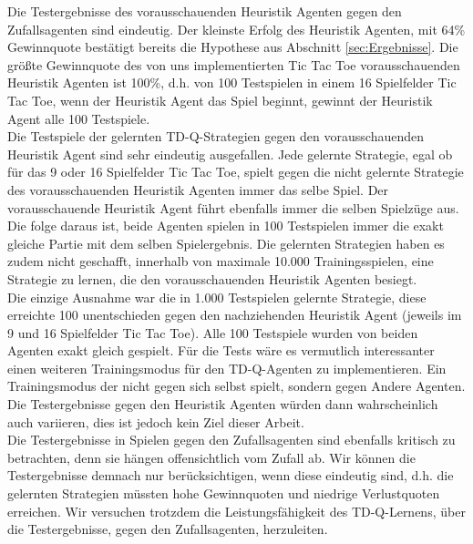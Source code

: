 Die Testergebnisse des vorausschauenden Heuristik Agenten gegen den Zufallsagenten sind eindeutig. Der kleinste Erfolg des Heuristik Agenten, mit 64\% Gewinnquote bestätigt bereits die Hypothese aus Abschnitt \ref{sec:Ergebnisse}. Die größte Gewinnquote des von uns implementierten Tic Tac Toe vorausschauenden Heuristik Agenten ist 100\%, d.h. von 100 Testspielen in einem 16 Spielfelder Tic Tac Toe, wenn der Heuristik Agent das Spiel beginnt, gewinnt der Heuristik Agent alle 100 Testspiele. \\

Die Testspiele der gelernten TD-Q-Strategien gegen den vorausschauenden Heuristik Agent sind sehr eindeutig ausgefallen. Jede gelernte Strategie, egal ob für das 9 oder 16 Spielfelder Tic Tac Toe, spielt gegen die nicht gelernte Strategie des vorausschauenden Heuristik Agenten immer das selbe Spiel. Der vorausschauende Heuristik Agent führt ebenfalls immer die selben Spielzüge aus. Die folge daraus ist, beide Agenten spielen in 100 Testspielen immer die exakt gleiche Partie mit dem selben Spielergebnis. Die gelernten Strategien haben es zudem nicht geschafft, innerhalb von maximale 10.000 Trainingsspielen, eine Strategie zu lernen, die den vorausschauenden Heuristik Agenten besiegt. \\

Die einzige Ausnahme war die in 1.000 Testspielen gelernte Strategie, diese erreichte 100 unentschieden gegen den nachziehenden Heuristik Agent (jeweils im 9 und 16 Spielfelder Tic Tac Toe). Alle 100 Testspiele wurden von beiden Agenten exakt gleich gespielt. Für die Tests wäre es vermutlich interessanter einen weiteren Trainingsmodus für den TD-Q-Agenten zu implementieren. Ein Trainingsmodus der nicht gegen sich selbst spielt, sondern gegen Andere Agenten. Die Testergebnisse gegen den Heuristik Agenten würden dann wahrscheinlich auch variieren, dies ist jedoch kein Ziel dieser Arbeit. \\

Die Testergebnisse in Spielen gegen den Zufallsagenten sind ebenfalls kritisch zu betrachten, denn sie hängen offensichtlich vom Zufall ab. Wir können die Testergebnisse demnach nur berücksichtigen, wenn diese eindeutig sind, d.h. die gelernten Strategien müssten hohe Gewinnquoten und niedrige Verlustquoten erreichen. Wir versuchen trotzdem die Leistungsfähigkeit des TD-Q-Lernens, über die Testergebnisse, gegen den Zufallsagenten, herzuleiten. \\ 